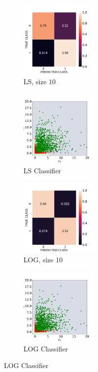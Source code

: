 \documentclass[12pt, a4 paper]{article}
\begin{document}
\begin{figure}[!htbp]
\centering
    \begin{subfigure}[!htbp]{0.2\textwidth}
       \centering
       \includegraphics[width=1.5in]{../results/ex1/acc_LS_dataset_Gamma_size_10.pdf}
       \caption{LS, size $10$}
       \label{fig:LS_P1a_10}
    \end{subfigure}
\quad
    \begin{subfigure}[!htbp]{0.2\textwidth}
       \centering
       \includegraphics[width=1.5in]{../results/ex1/samples_LS_dataset_Gamma_size_10.pdf}
       \caption{LS Classifier}
       \label{fig:LSD_P1a_10}
    \end{subfigure}
\quad
    \begin{subfigure}[!htbp]{0.2\textwidth}
       \centering
       \includegraphics[width=1.5in]{../results/ex1/acc_LOG_dataset_Gamma_size_10.pdf}
       \caption{LOG, size $10$}
       \label{fig:LOG_P1a_10}
    \end{subfigure}
\quad
    \begin{subfigure}[!htbp]{0.2\textwidth}
       \centering
       \includegraphics[width=1.5in]{../results/ex1/samples_LOG_dataset_Gamma_size_10.pdf}
       \caption{LOG Classifier}
       \label{fig:LOGD_P1a_10}
    \end{subfigure}
    

\end{figure}
\end{document}
